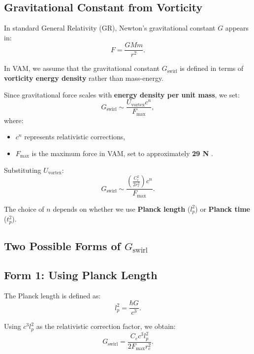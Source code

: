     \subsection*{Gravitational Constant from Vorticity}
    In standard General Relativity (GR), Newton's gravitational constant \( G \) appears in:
    \begin{equation*}
        F = \frac{GMm}{r^2}.
    \end{equation*}

    In VAM, we assume that the gravitational constant \(  G_\text{swirl} \) is defined in terms of \textbf{vorticity energy density} rather than mass-energy.

    Since gravitational force scales with \textbf{energy density per unit mass}, we set:
    \begin{equation*}
        G_\text{swirl} \sim \frac{U_\text{vortex} c^n}{F_{\max}},
    \end{equation*}
    where:
    \begin{itemize}
        \item \( c^n \) represents relativistic corrections,
        \item \( F_{\max} \) is the maximum force in VAM, set to approximately \textbf{29 N} \cite{schiller_max_force}.
    \end{itemize}

    Substituting \( U_\text{vortex} \):
    \begin{equation*}
        G_\text{swirl} \sim \frac{\left( \frac{C_e^2}{2 r_c^2} \right) c^n}{F_{\max}}.
    \end{equation*}

    The choice of \( n \) depends on whether we use \textbf{Planck length} (\( l_p^2 \)) or \textbf{Planck time} (\( t_p^2 \)).

    \subsection*{Two Possible Forms of \(  G_\text{swirl} \)}
    \subsection*{Form 1: Using Planck Length}
    The Planck length is defined as:
    \begin{equation*}
        l_p^2 = \frac{\hbar G}{c^3}.
    \end{equation*}

    Using \( c^3 l_p^2 \) as the relativistic correction factor, we obtain:
    \begin{equation*}
        G_\text{swirl} = \frac{C_e c^3 l_p^2}{2 F_{\max} r_c^2}.
    \end{equation*}

